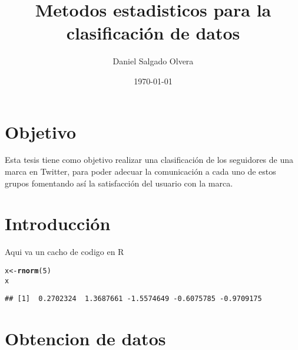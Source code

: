 \documentclass[openright, 12pt, twoside]{report}\usepackage[]{graphicx}\usepackage[]{color}
\makeatletter
\newcommand{\hlnum}[1]{\textcolor[rgb]{0.686,0.059,0.569}{#1}}%
\newcommand{\hlstd}[1]{\textcolor[rgb]{0.345,0.345,0.345}{#1}}%
\newcommand{\hlkwb}[1]{\textcolor[rgb]{0.69,0.353,0.396}{#1}}%
\newcommand{\hlkwd}[1]{\textcolor[rgb]{0.737,0.353,0.396}{\textbf{#1}}}%
\newenvironment{kframe}{%
 \def\at@end@of@kframe{}%
 \ifinner\ifhmode%
  \def\at@end@of@kframe{\end{minipage}}%
  \begin{minipage}{\columnwidth}%
 \fi\fi%
 \def\FrameCommand##1{\hskip\@totalleftmargin \hskip-\fboxsep
 \colorbox{shadecolor}{##1}\hskip-\fboxsep
     \hskip-\linewidth \hskip-\@totalleftmargin \hskip\columnwidth}%
 \MakeFramed {\advance\hsize-\width
   \@totalleftmargin\z@ \linewidth\hsize
   \@setminipage}}%
 {\par\unskip\endMakeFramed%
 \at@end@of@kframe}
\newenvironment{knitrout}{}{} %
\makeatother
\begin{document}
\pagestyle{empty}



\title{Metodos estadisticos para la clasificación de datos}

\author{Daniel Salgado Olvera}
\date{\today}
\maketitle

\chapter*{Objetivo}

Esta tesis tiene como objetivo realizar una clasificación de los seguidores de una marca en Twitter, para poder adecuar la comunicación a cada uno de estos grupos fomentando así la satisfacción del usuario con la marca.


\newpage

\tableofcontents


\chapter{Introducción}
\pagestyle{fancy}

Aqui va un cacho de codigo en R

\begin{knitrout}\small
{}\color{fgcolor}\begin{kframe}
\begin{alltt}
\hlstd{x} \hlkwb{<-} \hlkwd{rnorm}\hlstd{(}\hlnum{5}\hlstd{)}
\hlstd{x}
\end{alltt}
\begin{verbatim}
## [1]  0.2702324  1.3687661 -1.5574649 -0.6075785 -0.9709175
\end{verbatim}
\end{kframe}
\end{knitrout}

\chapter{Obtencion de datos}
\end{document}
